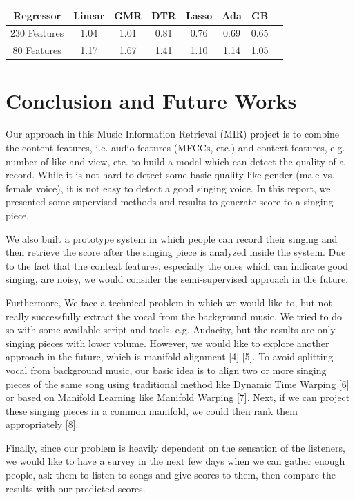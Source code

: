 \documentclass[paper=a4, fontsize=11pt, DIV=13]{scrartcl}
\begin{document}
\begin{center}
 \begin{tabular}{|c| c c c c c c c|} 
 \hline
 Regressor 
& Linear
& GMR
& DTR
& Lasso
& Ada
& GB
  \\ [0.5ex] 
 \hline\hline
 230 Features 
& 1.04
& 1.01
& 0.81
& 0.76
& 0.69
& 0.65
 \\ 
 \hline
 80 Features 

& 1.17
& 1.67
& 1.41
& 1.10
& 1.14
& 1.05
 \\
 \hline
\end{tabular}
\end{center}

\section{Conclusion and Future Works}

Our approach in this Music Information Retrieval (MIR) project is to combine the content features, i.e. audio features (MFCCs, etc.) and context features, e.g. number of like and view, etc. to build a model which can detect the quality of a record. While it is not hard to detect some basic quality like gender (male vs. female voice), it is not easy to detect a good singing voice. In this report, we presented some supervised methods and results to generate score to a singing piece. 

We also built a prototype system in which people can record their singing and then retrieve the score after the singing piece is analyzed inside the system. Due to the fact that the context features, especially the ones which can indicate good singing, are noisy, we would consider the semi-supervised approach in the future.

Furthermore, We face a technical problem in which we would like to, but not really successfully extract the vocal from the background music. We tried to do so with some available script and tools, e.g. Audacity, but the results are only singing pieces with lower volume. However, we would like to explore another approach in the future, which is manifold alignment [4] [5]. To avoid splitting vocal from background music, our basic idea is to align two or more singing pieces of the same song using traditional method like Dynamic Time Warping [6] or based on Manifold Learning like Manifold Warping [7]. Next, if we can project these singing pieces in a common manifold, we could then rank them appropriately [8].

Finally, since our problem is heavily dependent on the sensation of the listeners, we would like to have a survey in the next few days when we can gather enough people, ask them to listen to songs and give scores to them, then compare the results with our predicted scores.
\end{document}
